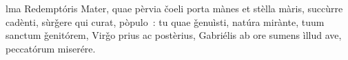 lma Redemptóris Mater, quae pèrvia čoeli porta mànes et stèlla màris, succùrre cadènti, sùrǧere qui curat, pòpulo~: tu quae ǧenuìsti, natúra mirànte, tuum sanctum ǧenitórem, Virǧo prius ac postèrius, Gabriélis ab ore sumens ìllud ave, peccatórum miserére.

